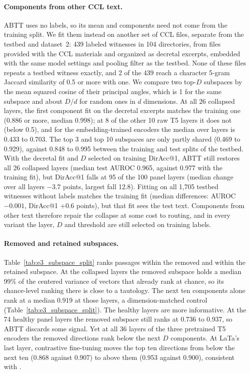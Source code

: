 \documentclass[11pt]{article}
\begin{document}
\paragraph{Components from other CCL text.}
\label{app:external_abtt}
ABTT uses no labels, so its mean and components need not come from the training split.
We fit them instead on another set of CCL files, separate from the testbed and dataset~2: 439 labeled witnesses in 104 directories, from files provided with the CCL materials and organized as decretal excerpts, embedded with the same model settings and pooling filter as the testbed.
None of these files repeats a testbed witness exactly, and 2 of the 439 reach a character 5-gram Jaccard similarity of 0.5 or more with one.
We compare two top-$D$ subspaces by the mean squared cosine of their principal angles, which is 1 for the same subspace and about $D/d$ for random ones in $d$ dimensions.
At all 26 collapsed layers, the first component fit on the decretal excerpts matches the training one (0.886 or more, median 0.998); at 8 of the other 10 raw T5 layers it does not (below 0.5), and for the embedding-trained encoders the median over layers is 0.433 to 0.703.
The top 3 and top 10 subspaces are only partly shared (0.469 to 0.929), against 0.848 to 0.995 between the training and test splits of the testbed.
With the decretal fit and $D$ selected on training DirAcc@1, ABTT still restores all 26 collapsed layers (median test AUROC 0.965, against 0.977 with the training fit), but DirAcc@1 falls at 95 of the 100 panel layers (median change over all layers $-3.7$ points, largest fall 12.8).
Fitting on all 1,705 testbed witnesses without labels matches the training fit (median differences: AUROC $-0.001$, DirAcc@1 $+0.6$ points), but that fit sees the test text.
Components from other text therefore repair the collapse at some cost to routing, and in every variant the layer, $D$ and threshold are still selected on training labels.

\paragraph{Removed and retained subspaces.}
Table~\ref{tab:e3_subspace_split} ranks passages within the removed and within the retained subspace.
At the collapsed layers the removed subspace holds a median 99\% of the centered variance of vectors that already rank at chance, so its chance-level ranking there is close to a tautology.
The next ten components alone rank at a median 0.919 at those layers, a dimension-matched control (Table~\ref{tab:e3_subspace_split}).
The healthy layers are more informative.
At the 74 healthy panel layers the removed subspace still ranks at 0.736 to 0.937, so ABTT discards some signal.
Yet at all 36 layers of the three pretrained T5 encoders the removed directions rank below the next $D$ components.
At LaTa's last layer, contrastive fine-tuning moves the top ten directions from below the next ten (0.868 against 0.907) to above them (0.953 against 0.900), consistent with \citet{rajaee2021finetuning}.
\end{document}
